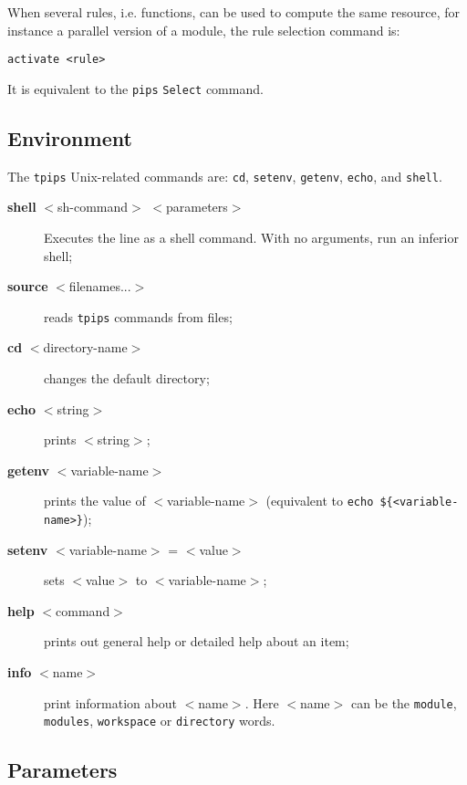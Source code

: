 \documentclass[a4paper]{article}
\begin{document}
When several rules, i.e. functions, can be used to compute
the same resource, for instance a parallel version of a
module, the rule selection command is:

{\bf
\begin{verbatim}
activate <rule>
\end{verbatim}
}

It is equivalent to the \texttt{pips} \texttt{Select} command.

\subsection{Environment}

The {\tt tpips} Unix-related commands are: \texttt{cd}, \texttt{setenv},
\texttt{getenv}, \texttt{echo}, and \texttt{shell}.

\begin{description}

\item[{\bf shell} $<$sh-command$>$ $<$parameters$>$] Executes the line
  as a shell command. With no arguments, run an inferior shell;

\item[{\bf source} $<$filenames...$>$] reads {\tt tpips} commands from
  files;

\item[{\bf cd} $<$directory-name$>$] changes the default directory;

\item[{\bf echo} $<$string$>$] prints $<$string$>$;

\item[{\bf getenv} $<$variable-name$>$] prints the value of
  $<$variable-name$>$ (equivalent to \verb+echo ${<variable-name>}+);
\item[{\bf setenv} $<$variable-name$>$ = $<$value$>$] sets $<$value$>$ to $<$variable-name$>$;

\item[{\bf help} $<$command$>$] prints out general help or detailed help
  about an item;

\item[{\bf info} $<$name$>$] print information about $<$name$>$. Here
  $<$name$>$ can be the \texttt{module}, \texttt{modules},
  \texttt{workspace} or \texttt{directory} words.

\end{description}


\subsection{Parameters}
\end{document}
